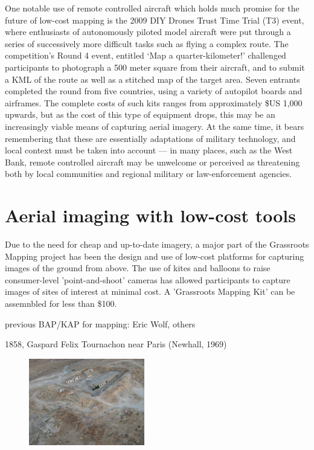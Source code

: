 \documentclass[11pt]{report}
\begin{document}
One notable use of remote controlled aircraft which holds much promise for the future of low-cost mapping is the 2009 DIY Drones Trust Time Trial (T3) event, where enthusiasts of autonomously piloted model aircraft were put through a series of successively more difficult tasks such as flying a complex route. The competition's Round 4 event, entitled `Map a quarter-kilometer!' challenged participants to photograph a 500 meter square from their aircraft, and to submit a KML of the route as well as a stitched map of the target area. Seven entrants completed the round from five countries, using a variety of autopilot boards and airframes.\cite{anderson2010winners} The complete costs of such kits ranges from approximately \$US 1,000 upwards, but as the cost of this type of equipment drops, this may be an increasingly viable means of capturing aerial imagery. At the same time, it bears remembering that these are essentially adaptations of military technology, and local context must be taken into account --- in many places, such as the West Bank, remote controlled aircraft may be unwelcome or perceived as threatening both by local communities and regional military or law-enforcement agencies. 

\section{Aerial imaging with low-cost tools}
\label{sec:aeriallowcost}

Due to the need for cheap and up-to-date imagery, a major part of the Grassroots Mapping project has been the design and use of low-cost platforms for capturing images of the ground from above. The use of kites and balloons to raise consumer-level 'point-and-shoot' cameras has allowed participants to capture images of sites of interest at minimal cost. A 'Grassroots Mapping Kit' can be assemnbled for less than \$100. 

previous BAP/KAP for mapping: Eric Wolf, others

1858, Gaspard Felix Tournachon near Paris (Newhall, 1969) \cite{vierling2006short}

\begin{figure}
	\begin{flushright}
		\includegraphics[width=0.45\textwidth]{images/maron-spy-satellite.jpg}
		\cite{maron2008former}
	\end{flushright}
\end{figure}
\end{document}

